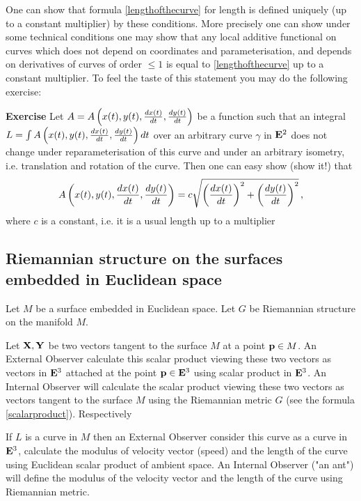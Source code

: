 \documentclass[12pt]{article}
\theoremstyle{theorem}
\numberwithin{equation}{section}
\begin{document}
{\footnotesize One can show that formula \eqref{lengthofthecurve}
for length is defined
uniquely (up to a constant multiplier) by these conditions.
More precisely one can show under some technical conditions
one may show that any local additive functional on curves which does not
depend on coordinates and parameterisation, and depends on
derivatives of curves of order $\leq 1$  is equal
to \eqref{lengthofthecurve} up to a constant multiplier. To feel the taste of this statement
you may do the following exercise:

 {\bf Exercise} Let
$A=A\left(x(t), y(t),
 {dx(t)\over dt},{dy(t)\over dt}\right)$ be a function such that
an integral $L=\int A\left(x(t), y(t),
  {dx(t)\over dt},{dy(t)\over dt}\right)dt$ over an arbitrary curve
$\gamma$
in ${\bf E}^2$ does not change
under reparameterisation of this curve and under an arbitrary isometry,
i.e. translation and rotation of the curve.
Then one can easy show (show it!) that
        $$
   A\left(x(t), y(t),
 {dx(t)\over dt},{dy(t)\over dt}\right)=
  c\sqrt {\left({dx(t)\over dt}\right)^2+
   \left({dy(t)\over dt}\right)^2}\,,
    $$
where $c$ is a constant, i.e. it is a usual length up to a multiplier
}



\subsection{Riemannian structure on the surfaces embedded in Euclidean space}


Let $M$ be a surface embedded in Euclidean space. Let $G$ be Riemannian structure on the manifold $M$.

  Let ${\bf X}, {\bf Y}$ be two vectors tangent to the surface
$M$ at a point ${\bf p}\in M$. An External Observer calculate this scalar product viewing
these two vectors as vectors in ${\bf E}^3$ attached at the point ${\bf p}\in {\bf E}^3$
using scalar product in   ${\bf E}^3$.  An Internal Observer will calculate the scalar product
viewing these two vectors as vectors  tangent to the surface $M$
using the Riemannian
metric $G$ (see the formula \eqref{scalarproduct}).  Respectively


If $L$ is a curve in $M$ then an External Observer consider this curve as a curve in ${\bf E}^3$,
calculate the modulus of velocity  vector (speed) and the length of the curve using Euclidean scalar
product of ambient space. An Internal Observer ("an ant") will define the modulus of the velocity vector and
the length of the curve using Riemannian metric.
\end{document}
